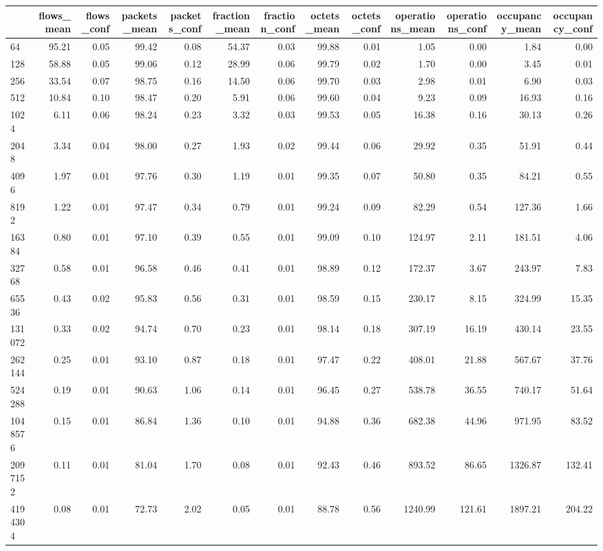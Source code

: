 \begin{tabular}{lrrrrrrrrrrrr}
\toprule
 & flows_mean & flows_conf & packets_mean & packets_conf & fraction_mean & fraction_conf & octets_mean & octets_conf & operations_mean & operations_conf & occupancy_mean & occupancy_conf \\
\midrule
64 & 95.21 & 0.05 & 99.42 & 0.08 & 54.37 & 0.03 & 99.88 & 0.01 & 1.05 & 0.00 & 1.84 & 0.00 \\
128 & 58.88 & 0.05 & 99.06 & 0.12 & 28.99 & 0.06 & 99.79 & 0.02 & 1.70 & 0.00 & 3.45 & 0.01 \\
256 & 33.54 & 0.07 & 98.75 & 0.16 & 14.50 & 0.06 & 99.70 & 0.03 & 2.98 & 0.01 & 6.90 & 0.03 \\
512 & 10.84 & 0.10 & 98.47 & 0.20 & 5.91 & 0.06 & 99.60 & 0.04 & 9.23 & 0.09 & 16.93 & 0.16 \\
1024 & 6.11 & 0.06 & 98.24 & 0.23 & 3.32 & 0.03 & 99.53 & 0.05 & 16.38 & 0.16 & 30.13 & 0.26 \\
2048 & 3.34 & 0.04 & 98.00 & 0.27 & 1.93 & 0.02 & 99.44 & 0.06 & 29.92 & 0.35 & 51.91 & 0.44 \\
4096 & 1.97 & 0.01 & 97.76 & 0.30 & 1.19 & 0.01 & 99.35 & 0.07 & 50.80 & 0.35 & 84.21 & 0.55 \\
8192 & 1.22 & 0.01 & 97.47 & 0.34 & 0.79 & 0.01 & 99.24 & 0.09 & 82.29 & 0.54 & 127.36 & 1.66 \\
16384 & 0.80 & 0.01 & 97.10 & 0.39 & 0.55 & 0.01 & 99.09 & 0.10 & 124.97 & 2.11 & 181.51 & 4.06 \\
32768 & 0.58 & 0.01 & 96.58 & 0.46 & 0.41 & 0.01 & 98.89 & 0.12 & 172.37 & 3.67 & 243.97 & 7.83 \\
65536 & 0.43 & 0.02 & 95.83 & 0.56 & 0.31 & 0.01 & 98.59 & 0.15 & 230.17 & 8.15 & 324.99 & 15.35 \\
131072 & 0.33 & 0.02 & 94.74 & 0.70 & 0.23 & 0.01 & 98.14 & 0.18 & 307.19 & 16.19 & 430.14 & 23.55 \\
262144 & 0.25 & 0.01 & 93.10 & 0.87 & 0.18 & 0.01 & 97.47 & 0.22 & 408.01 & 21.88 & 567.67 & 37.76 \\
524288 & 0.19 & 0.01 & 90.63 & 1.06 & 0.14 & 0.01 & 96.45 & 0.27 & 538.78 & 36.55 & 740.17 & 51.64 \\
1048576 & 0.15 & 0.01 & 86.84 & 1.36 & 0.10 & 0.01 & 94.88 & 0.36 & 682.38 & 44.96 & 971.95 & 83.52 \\
2097152 & 0.11 & 0.01 & 81.04 & 1.70 & 0.08 & 0.01 & 92.43 & 0.46 & 893.52 & 86.65 & 1326.87 & 132.41 \\
4194304 & 0.08 & 0.01 & 72.73 & 2.02 & 0.05 & 0.01 & 88.78 & 0.56 & 1240.99 & 121.61 & 1897.21 & 204.22 \\

\end{tabular}
